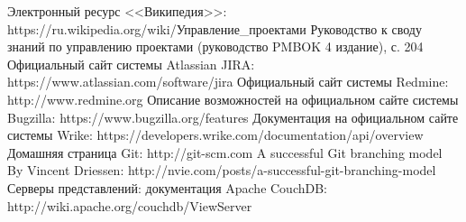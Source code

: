 \documentclass[14pt, a4paper]{extreport}
\begin{document}
\newpage
\clearpage
%
\begin{thebibliography}{}
 Электронный ресурс <<Википедия>>: \\https://ru.wikipedia.org/wiki/Управление\_проектами
 Руководство к своду знаний по управлению проектами (руководство PMBOK 4 издание), с. 204
 Официальный сайт системы Atlassian JIRA: https://www.atlassian.com/software/jira
 Официальный сайт системы Redmine: http://www.redmine.org
 Описание возможностей на официальном сайте системы Bugzilla: https://www.bugzilla.org/features
 Документация на официальном сайте системы Wrike: https://developers.wrike.com/documentation/api/overview
 Домашняя страница Git: http://git-scm.com
 A successful Git branching model By Vincent Driessen: http://nvie.com/posts/a-successful-git-branching-model
 Серверы представлений: документация Apache CouchDB: http://wiki.apache.org/couchdb/ViewServer
\end{thebibliography}
\end{document}
